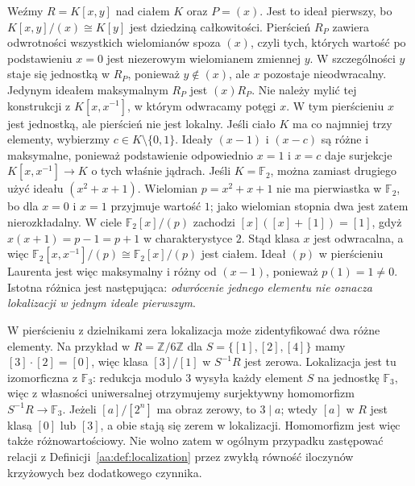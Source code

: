 \begin{przyklad}
\label{aa:prz:local-kxy}
Weźmy $R=K[x,y]$ nad ciałem $K$ oraz
$P=(x)$. Jest to ideał pierwszy, bo
$K[x,y]/(x)\cong K[y]$ jest dziedziną całkowitości.
Pierścień $R_P$ zawiera odwrotności wszystkich
wielomianów spoza $(x)$, czyli tych, których
wartość po podstawieniu $x=0$ jest niezerowym
wielomianem zmiennej $y$.
W szczególności $y$ staje się jednostką w $R_P$,
ponieważ $y\notin(x)$, ale $x$ pozostaje nieodwracalny.
Jedynym ideałem maksymalnym $R_P$ jest $(x)R_P$.
Nie należy mylić tej konstrukcji z $K[x,x^{-1}]$,
w którym odwracamy potęgi $x$. W tym pierścieniu
$x$ jest jednostką, ale pierścień nie jest lokalny.
Jeśli ciało $K$ ma co najmniej trzy elementy,
wybierzmy $c\in K\setminus\{0,1\}$. Ideały $(x-1)$
i $(x-c)$ są różne i maksymalne, ponieważ podstawienie
odpowiednio $x=1$ i $x=c$ daje surjekcje
$K[x,x^{-1}]\to K$ o tych właśnie jądrach.
Jeśli $K=\mathbb F_2$, można zamiast drugiego użyć
ideału $(x^2+x+1)$. Wielomian $p=x^2+x+1$ nie ma
pierwiastka w $\mathbb F_2$, bo dla $x=0$ i $x=1$
przyjmuje wartość $1$; jako wielomian stopnia dwa jest
zatem nierozkładalny. W ciele $\mathbb F_2[x]/(p)$
zachodzi $[x]([x]+[1])=[1]$, gdyż
$x(x+1)=p-1=p+1$ w charakterystyce $2$.
Stąd klasa $x$ jest odwracalna, a więc
$\mathbb F_2[x,x^{-1}]/(p)\cong\mathbb F_2[x]/(p)$
jest ciałem. Ideał $(p)$ w pierścieniu Laurenta
jest więc maksymalny i różny od $(x-1)$, ponieważ
$p(1)=1\ne0$.
Istotna różnica jest następująca:
\emph{odwrócenie jednego elementu nie oznacza lokalizacji
w jednym ideale pierwszym}.
\end{przyklad}

\begin{uwaga}
\label{aa:uw:localization-zerodivisors}
W pierścieniu z dzielnikami zera lokalizacja może
zidentyfikować dwa różne elementy. Na przykład
w $R=\mathbb Z/6\mathbb Z$ dla
$S=\{[1],[2],[4]\}$ mamy $[3]\cdot[2]=[0]$,
więc klasa $[3]/[1]$ w $S^{-1}R$ jest zerowa.
Lokalizacja jest tu izomorficzna z $\mathbb F_3$:
redukcja modulo $3$ wysyła każdy element $S$ na
jednostkę $\mathbb F_3$, więc z własności uniwersalnej
otrzymujemy surjektywny homomorfizm
$S^{-1}R\to\mathbb F_3$. Jeżeli $[a]/[2^n]$ ma obraz
zerowy, to $3\mid a$; wtedy $[a]$ w $R$ jest klasą
$[0]$ lub $[3]$, a obie stają się zerem w lokalizacji.
Homomorfizm jest więc także różnowartościowy.
Nie wolno zatem w ogólnym przypadku zastępować relacji
z Definicji~\ref{aa:def:localization} przez zwykłą
równość iloczynów krzyżowych bez dodatkowego czynnika.
\end{uwaga}

